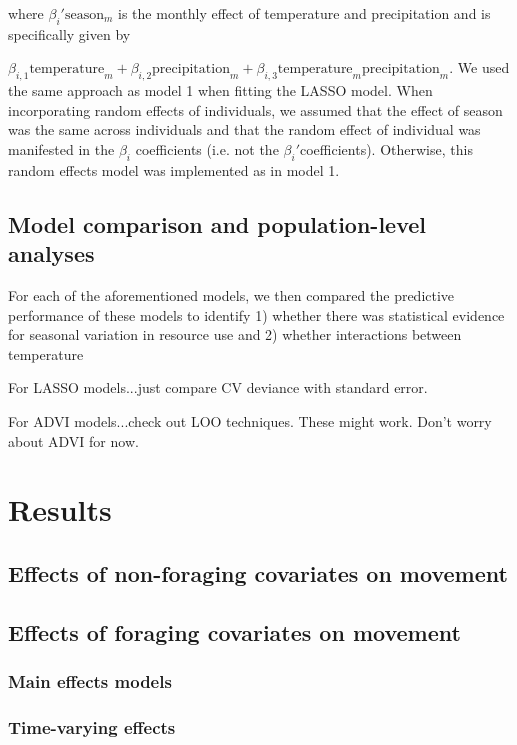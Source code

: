 \documentclass[a4paper]{article}
\begin{document}
where $\beta_i' \text{season}_m$ is the monthly effect of temperature and precipitation and is specifically given by {$\beta_{i, 1}\text{temperature}_m + \beta_{i, 2} \text{precipitation}_m + \beta_{i, 3} \text{temperature}_m \text{precipitation}_m$.  We used the same approach as model 1 when fitting the LASSO model. When incorporating random effects of individuals, we assumed that the effect of season was the same across individuals and that the random effect of individual was manifested in the $\beta_i$ coefficients (i.e. not the $\beta_i'$coefficients).  Otherwise, this random effects model was implemented as in model 1. 

\subsection*{Model comparison and population-level analyses}

For each of the aforementioned models, we then compared the predictive performance of these models to identify 1) whether there was statistical evidence for seasonal variation in resource use and 2) whether interactions between temperature 

For LASSO models...just compare CV deviance with standard error.

For ADVI models...check out LOO techniques.  These might work. Don't worry about ADVI for now. 

\section*{Results}

\subsection*{Effects of non-foraging covariates on movement}

\subsection*{Effects of foraging covariates on movement}

\subsubsection*{Main effects models}

\subsubsection*{Time-varying effects}

}
\end{document}
